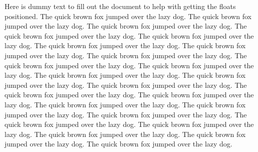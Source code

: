 Here is dummy text to fill out the document to help with getting the floats positioned. The quick brown fox jumped over the lazy dog. The quick brown fox jumped over the lazy dog. The quick brown fox jumped over the lazy dog. The quick brown fox jumped over the lazy dog. The quick brown fox jumped over the lazy dog. The quick brown fox jumped over the lazy dog. The quick brown fox jumped over the lazy dog. The quick brown fox jumped over the lazy dog. The quick brown fox jumped over the lazy dog. The quick brown fox jumped over the lazy dog. The quick brown fox jumped over the lazy dog. The quick brown fox jumped over the lazy dog. The quick brown fox jumped over the lazy dog. The quick brown fox jumped over the lazy dog. The quick brown fox jumped over the lazy dog. The quick brown fox jumped over the lazy dog. The quick brown fox jumped over the lazy dog. The quick brown fox jumped over the lazy dog. The quick brown fox jumped over the lazy dog. The quick brown fox jumped over the lazy dog. The quick brown fox jumped over the lazy dog. The quick brown fox jumped over the lazy dog. The quick brown fox jumped over the lazy dog. 

